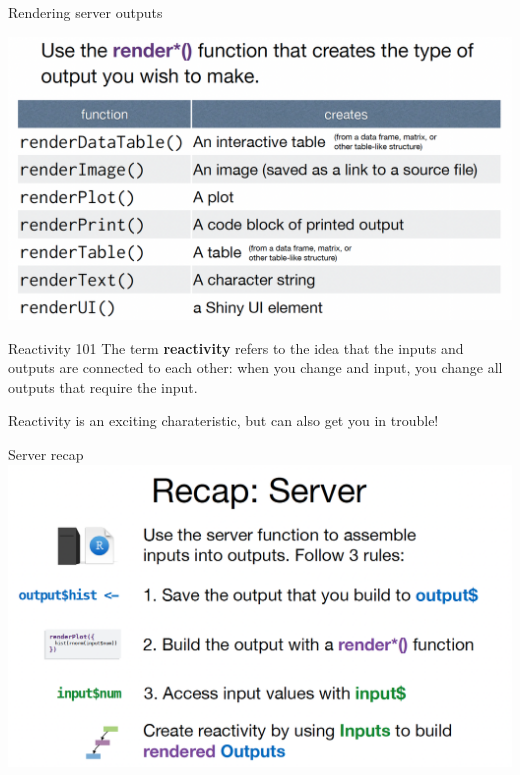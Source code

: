 \documentclass[
  ignorenonframetext,
]{beamer}
\begin{document}
\begin{frame}{Rendering server outputs}
\label{rendering-server-outputs-2}
\center

\includegraphics{shinyfigs/shiny_render3.png}
\end{frame}

\begin{frame}{Reactivity 101}
\label{reactivity-101}
The term \textbf{reactivity} refers to the idea that the inputs and
outputs are connected to each other: when you change and input, you
change all outputs that require the input.

Reactivity is an exciting charateristic, but can also get you in
trouble!
\end{frame}

\begin{frame}{Server recap}
\label{server-recap}
\includegraphics{shinyfigs/shiny_server_recap.png}
\end{frame}
\end{document}
